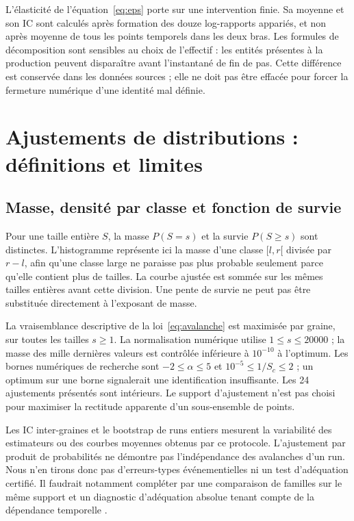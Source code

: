 L'élasticité de l'équation~\eqref{eq:eps} porte sur une intervention
finie. Sa moyenne et son IC sont calculés après formation des douze
log-rapports appariés, et non après moyenne de tous les points temporels
dans les deux bras. Les formules de décomposition sont sensibles au
choix de l'effectif : les entités présentes à la production peuvent
disparaître avant l'instantané de fin de pas. Cette différence est
conservée dans les données sources ; elle ne doit pas être effacée pour
forcer la fermeture numérique d'une identité mal définie.

\section{Ajustements de distributions : définitions et limites}\label{sec:ajustements}
\subsection{Masse, densité par classe et fonction de survie}
Pour une taille entière $S$, la masse $P(S=s)$ et la survie
$P(S\ge s)$ sont distinctes. L'histogramme représente ici la masse
d'une classe $[l,r[$ divisée par $r-l$, afin qu'une classe large ne
paraisse pas plus probable seulement parce qu'elle contient plus
de tailles. La courbe ajustée est sommée sur les mêmes tailles
entières avant cette division. Une pente de survie ne peut pas être
substituée directement à l'exposant de masse.

La vraisemblance descriptive de la loi~\eqref{eq:avalanche} est maximisée
par graine, sur toutes les tailles $s\ge1$. La normalisation numérique
utilise $1\le s\le20000$ ; la masse des mille dernières valeurs est
contrôlée inférieure à $10^{-10}$ à l'optimum. Les bornes numériques
de recherche sont $-2\le\alpha\le5$ et
$10^{-5}\le1/S_c\le2$ ; un optimum sur une borne signalerait une
identification insuffisante. Les 24 ajustements présentés sont intérieurs.
Le support d'ajustement n'est pas choisi pour maximiser la rectitude
apparente d'un sous-ensemble de points.

Les IC inter-graines et le bootstrap de runs entiers mesurent la
variabilité des estimateurs ou des courbes moyennes obtenus par ce
protocole. L'ajustement par produit de probabilités ne démontre pas
l'indépendance des avalanches d'un run. Nous n'en tirons donc pas
d'erreurs-types événementielles ni un test d'adéquation certifié.
Il faudrait notamment compléter par une comparaison de familles sur
le même support et un diagnostic d'adéquation absolue tenant compte
de la dépendance temporelle \cite{clauset}.

